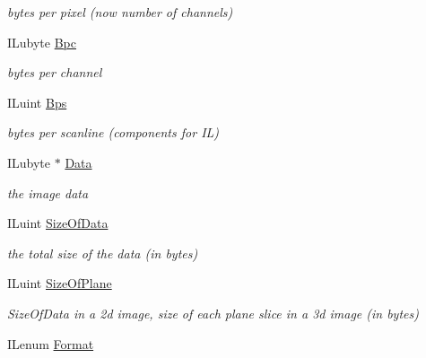 \begin{DoxyCompactItemize}
\begin{DoxyCompactList}\small\item\em bytes per pixel (now number of channels) \end{DoxyCompactList}\item 
\hypertarget{struct_i_limage_a20c53053c80d504de93c3ee17290a9ba}{I\+Lubyte \hyperlink{struct_i_limage_a20c53053c80d504de93c3ee17290a9ba}{Bpc}}\label{struct_i_limage_a20c53053c80d504de93c3ee17290a9ba}

\begin{DoxyCompactList}\small\item\em bytes per channel \end{DoxyCompactList}\item 
\hypertarget{struct_i_limage_a09ee9478fab289cf2622f06db9171894}{I\+Luint \hyperlink{struct_i_limage_a09ee9478fab289cf2622f06db9171894}{Bps}}\label{struct_i_limage_a09ee9478fab289cf2622f06db9171894}

\begin{DoxyCompactList}\small\item\em bytes per scanline (components for I\+L) \end{DoxyCompactList}\item 
\hypertarget{struct_i_limage_ab7a9627719d89abb3cb48087452acbc8}{I\+Lubyte $\ast$ \hyperlink{struct_i_limage_ab7a9627719d89abb3cb48087452acbc8}{Data}}\label{struct_i_limage_ab7a9627719d89abb3cb48087452acbc8}

\begin{DoxyCompactList}\small\item\em the image data \end{DoxyCompactList}\item 
\hypertarget{struct_i_limage_a9e84436c94d9cd5afad59be12dff753b}{I\+Luint \hyperlink{struct_i_limage_a9e84436c94d9cd5afad59be12dff753b}{Size\+Of\+Data}}\label{struct_i_limage_a9e84436c94d9cd5afad59be12dff753b}

\begin{DoxyCompactList}\small\item\em the total size of the data (in bytes) \end{DoxyCompactList}\item 
\hypertarget{struct_i_limage_a5ce85bc0b983ddf0ed91b1ed98d9132a}{I\+Luint \hyperlink{struct_i_limage_a5ce85bc0b983ddf0ed91b1ed98d9132a}{Size\+Of\+Plane}}\label{struct_i_limage_a5ce85bc0b983ddf0ed91b1ed98d9132a}

\begin{DoxyCompactList}\small\item\em Size\+Of\+Data in a 2d image, size of each plane slice in a 3d image (in bytes) \end{DoxyCompactList}\item 
\hypertarget{struct_i_limage_af36941d08ffdd7ed7c42cdb11d2a5513}{I\+Lenum \hyperlink{struct_i_limage_af36941d08ffdd7ed7c42cdb11d2a5513}{Format}}\label{struct_i_limage_af36941d08ffdd7ed7c42cdb11d2a5513}


\end{DoxyCompactItemize}
